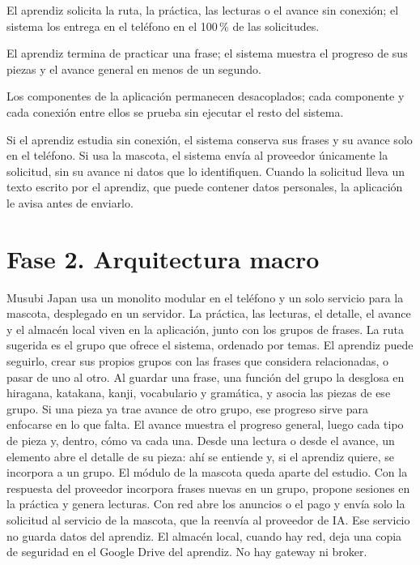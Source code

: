 \documentclass[11pt]{article}
\begin{document}
\begin{description}
  \raggedright
  \item[Disponibilidad.] El aprendiz solicita la ruta, la práctica, las lecturas o el avance sin conexión; el sistema los entrega en el teléfono en el 100\,\% de las solicitudes.
  \item[Rendimiento.] El aprendiz termina de practicar una frase; el sistema muestra el progreso de sus piezas y el avance general en menos de un segundo.
  \item[Mantenibilidad.] Los componentes de la aplicación permanecen desacoplados; cada componente y cada conexión entre ellos se prueba sin ejecutar el resto del sistema.
  \item[Seguridad.] Si el aprendiz estudia sin conexión, el sistema conserva sus frases y su avance solo en el teléfono. Si usa la mascota, el sistema envía al proveedor únicamente la solicitud, sin su avance ni datos que lo identifiquen. Cuando la solicitud lleva un texto escrito por el aprendiz, que puede contener datos personales, la aplicación le avisa antes de enviarlo.
\end{description}

\section{Fase 2. Arquitectura macro}

Musubi Japan usa un monolito modular en el teléfono y un solo servicio para la mascota, desplegado en un servidor. La práctica, las lecturas, el detalle, el avance y el almacén local viven en la aplicación, junto con los grupos de frases. La ruta sugerida es el grupo que ofrece el sistema, ordenado por temas. El aprendiz puede seguirlo, crear sus propios grupos con las frases que considera relacionadas, o pasar de uno al otro. Al guardar una frase, una función del grupo la desglosa en hiragana, katakana, kanji, vocabulario y gramática, y asocia las piezas de ese grupo. Si una pieza ya trae avance de otro grupo, ese progreso sirve para enfocarse en lo que falta. El avance muestra el progreso general, luego cada tipo de pieza y, dentro, cómo va cada una. Desde una lectura o desde el avance, un elemento abre el detalle de su pieza: ahí se entiende y, si el aprendiz quiere, se incorpora a un grupo. El módulo de la mascota queda aparte del estudio. Con la respuesta del proveedor incorpora frases nuevas en un grupo, propone sesiones en la práctica y genera lecturas. Con red abre los anuncios o el pago y envía solo la solicitud al servicio de la mascota, que la reenvía al proveedor de IA. Ese servicio no guarda datos del aprendiz. El almacén local, cuando hay red, deja una copia de seguridad en el Google Drive del aprendiz. No hay gateway ni broker.
\end{document}
